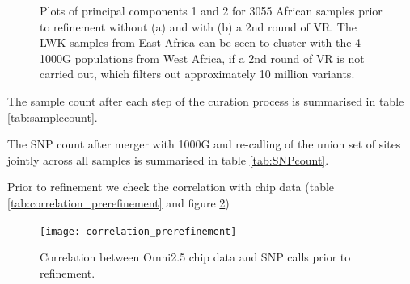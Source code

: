 \begin{figure}[h]
\begin{subfigure}{.5\textwidth}
  \caption{}
\end{subfigure}%
\caption{Plots of principal components 1 and 2 for 3055 African samples prior to refinement without (a) and with (b) a 2nd round of \gls{VR}. The LWK samples from East Africa can be seen to cluster with the 4 1000G populations from West Africa, if a 2nd round of \gls{VR} is not carried out, which filters out approximately 10 million variants.}
\label{fig:PCAprepostVR}
\end{figure}

The sample count after each step of the curation process is summarised in table \ref{tab:samplecount}.

The SNP count after merger with 1000G and re-calling of the union set of sites jointly across all samples is summarised in table \ref{tab:SNPcount}.

Prior to refinement we check the correlation with chip data (table \ref{tab:correlation_prerefinement} and figure \ref{fig:correlation_prerefinement})



\begin{figure}[h]
    \centering
    \texttt{[image: correlation\_prerefinement]}
    \caption{Correlation between Omni2.5 chip data and SNP calls prior to refinement.}
    \label{fig:correlation_prerefinement}
\end{figure}



